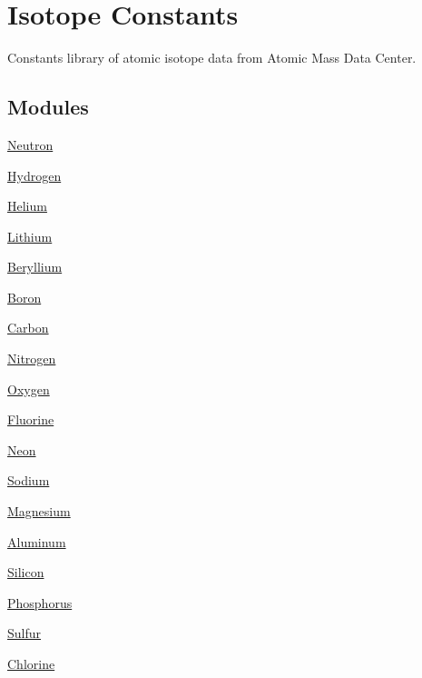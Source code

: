 \hypertarget{group___isotope_const}{}\section{Isotope Constants}
\label{group___isotope_const}


Constants library of atomic isotope data from Atomic Mass Data Center.  


\subsection*{Modules}
\begin{DoxyCompactItemize}
\item 
\mbox{\hyperlink{group___isotope_const-_neutron}{Neutron}}
\item 
\mbox{\hyperlink{group___isotope_const-_hydrogen}{Hydrogen}}
\item 
\mbox{\hyperlink{group___isotope_const-_helium}{Helium}}
\item 
\mbox{\hyperlink{group___isotope_const-_lithium}{Lithium}}
\item 
\mbox{\hyperlink{group___isotope_const-_beryllium}{Beryllium}}
\item 
\mbox{\hyperlink{group___isotope_const-_boron}{Boron}}
\item 
\mbox{\hyperlink{group___isotope_const-_carbon}{Carbon}}
\item 
\mbox{\hyperlink{group___isotope_const-_nitrogen}{Nitrogen}}
\item 
\mbox{\hyperlink{group___isotope_const-_oxygen}{Oxygen}}
\item 
\mbox{\hyperlink{group___isotope_const-_fluorine}{Fluorine}}
\item 
\mbox{\hyperlink{group___isotope_const-_neon}{Neon}}
\item 
\mbox{\hyperlink{group___isotope_const-_sodium}{Sodium}}
\item 
\mbox{\hyperlink{group___isotope_const-_magnesium}{Magnesium}}
\item 
\mbox{\hyperlink{group___isotope_const-_aluminum}{Aluminum}}
\item 
\mbox{\hyperlink{group___isotope_const-_silicon}{Silicon}}
\item 
\mbox{\hyperlink{group___isotope_const-_phosphorus}{Phosphorus}}
\item 
\mbox{\hyperlink{group___isotope_const-_sulfur}{Sulfur}}
\item 
\mbox{\hyperlink{group___isotope_const-_chlorine}{Chlorine}}

\end{DoxyCompactItemize}
